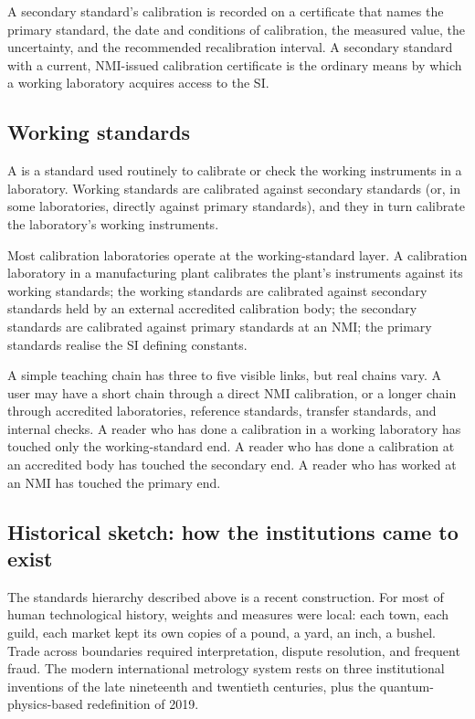 A secondary standard's calibration is recorded on a certificate
that names the primary standard, the date and conditions of
calibration, the measured value, the uncertainty, and the recommended
recalibration interval. A secondary standard with a current,
NMI-issued calibration certificate is the ordinary means by which a
working laboratory acquires access to the SI.

\subsection{Working standards}

A  is a standard used routinely to
calibrate or check the working instruments in a laboratory. Working
standards are calibrated against secondary standards (or, in some
laboratories, directly against primary standards), and they in turn
calibrate the laboratory's working instruments.

Most calibration laboratories operate at the working-standard layer.
A calibration laboratory in a manufacturing plant calibrates the
plant's instruments against its working standards; the working
standards are calibrated against secondary standards held by an
external accredited calibration body; the secondary standards are
calibrated against primary standards at an NMI; the primary
standards realise the SI defining constants.

A simple teaching chain has three to five visible links, but real
chains vary. A user may have a short chain through a direct NMI
calibration, or a longer chain through accredited laboratories,
reference standards, transfer standards, and internal checks. A
reader who has done a calibration in a working laboratory has
touched only the working-standard end. A reader who has done a
calibration at an accredited body has touched the secondary end. A
reader who has worked at an NMI has touched the primary end.

\subsection{Historical sketch: how the institutions came to exist}

The standards hierarchy described above is a recent construction.
For most of human technological history, weights and measures were
local: each town, each guild, each market kept its own copies of a
pound, a yard, an inch, a bushel. Trade across boundaries required
interpretation, dispute resolution, and frequent fraud. The modern
international metrology system rests on three institutional
inventions of the late nineteenth and twentieth centuries, plus the
quantum-physics-based redefinition of 2019.

